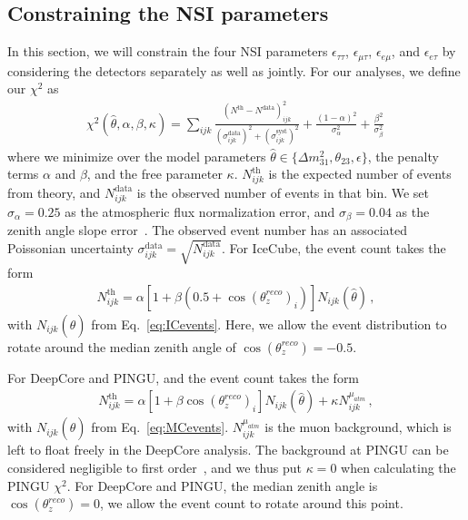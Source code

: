 \documentclass[draft=True]{revtex4-2}
\newcommand{\zreco}{\ensuremath{\cos{(\theta_z^{reco})}}}
\newcommand{\emt}{\ensuremath{\epsilon_{\mu\tau}}}
\newcommand{\eet}{\epsilon_{e\tau}}
\newcommand{\eem}{\epsilon_{e\mu}}
\newcommand{\ett}{\ensuremath{\epsilon_{\tau\tau}}}
\newcommand{\dm}{\Delta m^2_{31}}
\begin{document}
\subsection{Constraining the NSI parameters}\label{sec:method}
In this section, we will constrain the four NSI parameters $\ett$, $\emt$, $\eem$, and $\eet$ by considering the detectors separately as well as jointly.
For our analyses, we define our $\chi^2$ as
\begin{align} \label{eq:chisq}
    \chi^{2}(\hat{\theta},\alpha,\beta, \kappa)=\sum_{ijk} \frac{\left(N^\text{th}-N^\text{data}\right)_{ijk}^{2}}
    {\left(\sigma^\text{data}_{ijk}\right)^{2} + \left(\sigma^\text{syst}_{ijk}\right)^{2}}+ 
    \frac{(1-\alpha)^2}{\sigma_\alpha^2} + \frac{\beta^2}{\sigma_\beta^2}\,
\end{align}
where we minimize over the model parameters $\hat{\theta} \in \{\dm, \theta_{23}, \epsilon\}$, the penalty terms $\alpha$ and $\beta$, and the free parameter $\kappa$.
$N_{ijk}^\text{th}$ is the expected number of events from theory, and $N_{ijk}^\text{data}$ is the observed number of events in that bin. 
We set $\sigma_\alpha = 0.25$ as the atmospheric flux normalization error, and $\sigma_\beta = 0.04$ as the zenith angle slope error~\cite{hondapaper}. 
The observed event number has an associated Poissonian uncertainty $\sigma_{ijk}^\text{data} = \sqrt{N_{ijk}^\text{data}}$.
For IceCube, the event count takes the form
\begin{align}
    N^\text{th}_{ijk} = \alpha\left[1+\beta (0.5 + \zreco_i )\right] N_{ijk}(\hat{\theta})\,,
\end{align}
with $N_{ijk}(\hat{\theta})$ from Eq.~\ref{eq:ICevents}. Here, we allow the event distribution to rotate around the median zenith angle of $\zreco = -0.5$.

For DeepCore and PINGU, and the event count takes the form
\begin{align}
    N^\text{th}_{ijk} = \alpha\left[1+\beta \zreco_i \right] N_{ijk}(\hat{\theta}) + \kappa N_{ijk}^{\mu_{atm}}\,,
\end{align}
with $N_{ijk}(\hat{\theta})$ from Eq.~\ref{eq:MCevents}. $N_{ijk}^{\mu_{atm}}$ is the muon background, which is left to float freely in the DeepCore analysis.
The background at PINGU can be considered negligible to first order~\cite{PINGUdata}, and we thus put $\kappa=0$ when calculating the PINGU $\chi^2$.
For DeepCore and PINGU, the median zenith angle is $\zreco = 0$, we allow the event count to rotate around this point.
\end{document}
